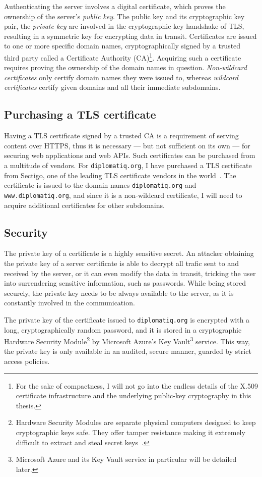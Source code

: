 Authenticating the server involves a digital certificate, which proves the ownership of the server's \emph{public key}. The public key and its cryptographic key pair, the \emph{private key} are involved in the cryptographic key handshake of TLS, resulting in a symmetric key for encrypting data in transit. Certificates are issued to one or more specific domain names, cryptographically signed by a trusted third party called a Certificate Authority (CA)\footnote{For the sake of compactness, I will not go into the endless details of the X.509 certificate infrastructure and the underlying public-key cryptography in this thesis.}. Acquiring such a certificate requires proving the ownership of the domain names in question. \emph{Non-wildcard certificates} only certify domain names they were issued to, whereas \emph{wildcard certificates} certify given domains and all their immediate subdomains.

\subsection{Purchasing a TLS certificate}

Having a TLS certificate signed by a trusted CA is a requirement of serving content over HTTPS, thus it is necessary — but not sufficient on its own — for securing web applications and web APIs. Such certificates can be purchased from a multitude of vendors. For \lstinline{diplomatiq.org}, I have purchased a TLS certificate from Sectigo, one of the leading TLS certificate vendors in the world~\cite{sectigo-website}. The certificate is issued to the domain names \lstinline{diplomatiq.org} and \lstinline{www.diplomatiq.org}, and since it is a non-wildcard certificate, I will need to acquire additional certificates for other subdomains.

\subsection{Security}

The private key of a certificate is a highly sensitive secret. An attacker obtaining the private key of a server certificate is able to decrypt all trafic sent to and received by the server, or it can even modify the data in transit, tricking the user into surrendering sensitive information, such as passwords. While being stored securely, the private key needs to be always available to the server, as it is constantly involved in the communication.

The private key of the certificate issued to \lstinline{diplomatiq.org} is encrypted with a long, cryptographically random password, and it is stored in a cryptographic Hardware Security Module\footnote{Hardware Security Modules are separate physical computers designed to keep cryptographic keys safe. They offer tamper resistance making it extremely difficult to extract and steal secret keys~\cite{fips-140-3}.} by Microsoft Azure's Key Vault\footnote{Microsoft Azure and its Key Vault service in particular will be detailed later.} service. This way, the private key is only available in an audited, secure manner, guarded by strict access policies.

